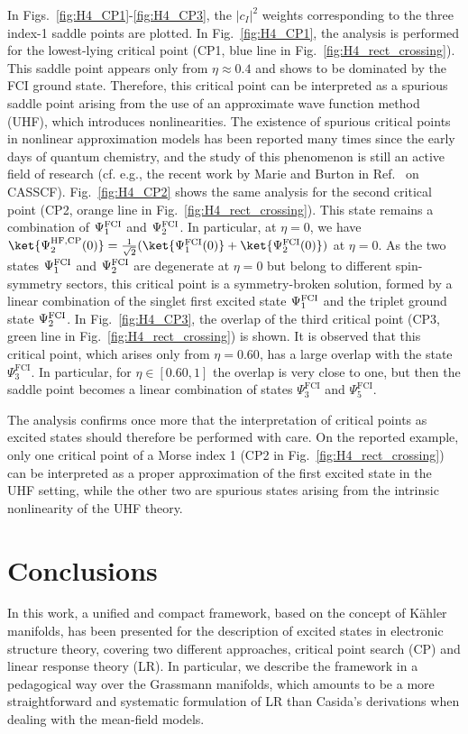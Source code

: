 \documentclass[11pt]{article}
\begin{document}
In Figs.~\ref{fig:H4_CP1}-\ref{fig:H4_CP3}, the $|c_I|^2$ weights corresponding to the three index-1 saddle points are plotted. In Fig.~\ref{fig:H4_CP1}, the analysis is performed for the lowest-lying critical point (CP1, blue line in Fig.~\ref{fig:H4_rect_crossing}). This saddle point appears only from $\eta\approx0.4$ and shows to be dominated by the FCI ground state. Therefore, this critical point can be interpreted as a spurious saddle point arising from the use of an approximate wave function method (UHF), which introduces nonlinearities. The existence of spurious critical points in nonlinear approximation models has been reported many times since the early days of quantum chemistry, and the study of this phenomenon is still an active field of research (cf. e.g., the recent work by Marie and Burton in Ref.~\cite{Marie2023} on CASSCF). 
Fig.~\ref{fig:H4_CP2} shows the same analysis for the second critical point (CP2, orange line in Fig.~\ref{fig:H4_rect_crossing}). This state remains a combination of $\Psi_1^{\rm FCI}$ and $\Psi_2^{\rm FCI}$. In particular, at $\eta=0$, we have $\ket{\Psi_{2}^{\mathrm{HF,CP}}(0)}=\frac{1}{\sqrt{2}}(\ket{\Psi_1^{\mathrm{FCI}}(0)}+\ket{\Psi_2^{\mathrm{FCI}}(0)})$ at $\eta=0$. As the two states $\Psi_1^{\rm FCI}$ and $\Psi_2^{\rm FCI}$ are degenerate at $\eta=0$ but belong to different spin-symmetry sectors, this critical point is a symmetry-broken solution, formed by a linear combination of the singlet first excited state $\Psi_1^{\rm FCI}$ and the  triplet ground state $\Psi_2^{\rm FCI}$. In Fig.~\ref{fig:H4_CP3}, the overlap of the third critical point (CP3, green line in Fig.~\ref{fig:H4_rect_crossing}) is shown. It is observed that this critical point, which arises only from $\eta=0.60$, has a large overlap with the state $\Psi_3^{\mathrm{FCI}}$. In particular, for $\eta\in[0.60,1]$ the overlap is very close to one, but then the saddle point becomes a linear combination of states $\Psi_3^{\mathrm{FCI}}$ and $\Psi_5^{\mathrm{FCI}}$. 

The analysis confirms once more that the interpretation of critical points as excited states should therefore be performed with care. On the reported example, only one critical point of a Morse index 1 (CP2 in Fig.~\ref{fig:H4_rect_crossing}) can be interpreted as a proper approximation of the first excited state in the UHF setting, while the other two are spurious states arising from the intrinsic nonlinearity of the UHF theory.

\section{Conclusions}
In this work, a unified and compact framework, based on the concept of Kähler manifolds, has been presented for the description of excited states in electronic structure theory, covering two different approaches, critical point search (CP) and linear response theory (LR). In particular, we describe the framework in a pedagogical way over the Grassmann manifolds, which amounts to be a more straightforward and systematic formulation of LR than Casida's derivations when dealing with the mean-field models. 
\end{document}

